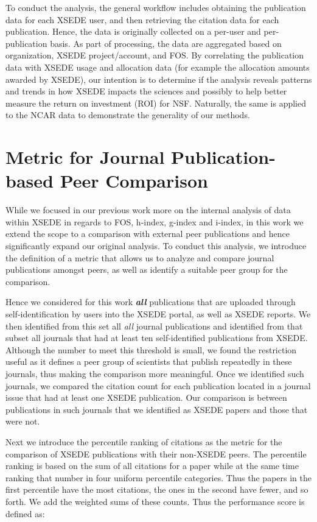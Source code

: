 \documentclass[10pt, conference, compsocconf]{IEEEtran}
\begin{document}
To conduct the analysis, the general workflow includes obtaining the publication data for each XSEDE user, and then retrieving the citation data for each publication. Hence, the data is originally collected on a per-user and per-publication basis. As part of processing, the data are aggregated based on organization, XSEDE project/account, and FOS.  By correlating the publication data with XSEDE usage and allocation data (for example the allocation amounts awarded by XSEDE), our intention is to determine if the analysis reveals patterns and trends in how XSEDE impacts the sciences and possibly to help better measure the return on investment (ROI) for NSF. Naturally, the same is applied to the NCAR data to demonstrate the generality of our methods.

\section{Metric for Journal Publication-based Peer Comparison} \label{S:metric}

While we focused in our previous work more on the internal analysis of data within XSEDE in regards to FOS, h-index, g-index and i-index, in this work we extend the scope to a comparison with external peer publications and hence significantly expand our original analysis. To conduct this analysis, we introduce the definition of a metric that allows us to analyze and compare journal publications amongst peers, as well as identify a suitable peer group for the comparison.

Hence we considered for this work {\em\bf all} publications that are uploaded through self-identification by users into the XSEDE portal, as well as XSEDE reports. We then identified from this set all {\em all} journal publications and identified from that subset all journals that had at least ten self-identified publications from XSEDE. Although the number to meet this threshold is small, we found the restriction useful as it defines a peer group of scientists that publish repeatedly in these journals, thus making the comparison more meaningful. Once we identified such journals, we compared the citation count for each publication located in a journal issue that had at least one XSEDE publication. Our comparison is between publications in such journals that we identified as XSEDE papers and those that were not. 

Next we introduce the percentile ranking of citations as the metric for the comparison of XSEDE publications with their non-XSEDE peers. The percentile ranking is based on the sum of all citations for a paper while at the same time ranking that number in four uniform percentile categories. Thus the papers in the first percentile have the most citations, the ones in the second have fewer, and so forth.  We add the weighted sums of these counts. Thus the performance score is defined as:
\end{document}
